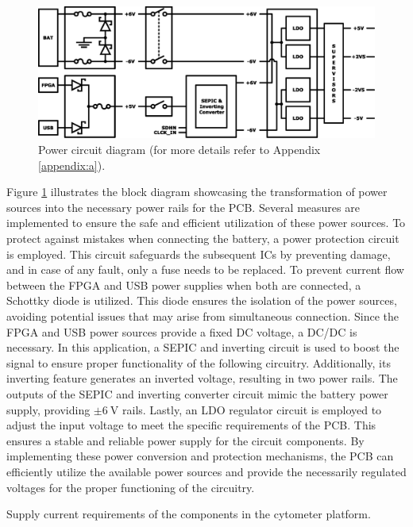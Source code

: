 \begin{figure}[!ht]
    \centering
    \includegraphics[width=.85\textwidth]{images/chapter_4/power/power.eps}
    \caption{Power circuit diagram (for more details refer to Appendix \ref{appendix:a}).}
    \label{figure:pwr-sources}
\end{figure}

Figure \ref{figure:pwr-sources} illustrates the block diagram showcasing the transformation of power sources into the necessary power rails for the \ac{PCB}. Several measures are implemented to ensure the safe and efficient utilization of these power sources. To protect against mistakes when connecting the battery, a power protection circuit is employed. This circuit safeguards the subsequent \ac{IC}s by preventing damage, and in case of any fault, only a fuse needs to be replaced. To prevent current flow between the \ac{FPGA} and \ac{USB} power supplies when both are connected, a Schottky diode is utilized. This diode ensures the isolation of the power sources, avoiding potential issues that may arise from simultaneous connection. Since the \ac{FPGA} and \ac{USB} power sources provide a fixed \ac{DC} voltage, a \ac{DC}/\ac{DC} is necessary. In this application, a \ac{SEPIC} and inverting circuit is used to boost the signal to ensure proper functionality of the following circuitry. Additionally, its inverting feature generates an inverted voltage, resulting in two power rails. The outputs of the \ac{SEPIC} and inverting converter circuit mimic the battery power supply, providing $\mathrm{\pm 6~V}$ rails. Lastly, an \ac{LDO} regulator circuit is employed to adjust the input voltage to meet the specific requirements of the \ac{PCB}. This ensures a stable and reliable power supply for the circuit components. By implementing these power conversion and protection mechanisms, the \ac{PCB} can efficiently utilize the available power sources and provide the necessarily regulated voltages for the proper functioning of the circuitry.

\begin{table}[ht]
    \centering
    \caption{Supply current requirements of the components in the cytometer platform.}
    \begin{small}
    
    \end{small}
    \label{tab:pwr-consumption}
\end{table}

